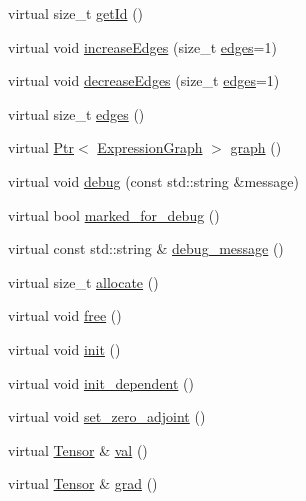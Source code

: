 \begin{DoxyCompactItemize}
\item 
virtual size\+\_\+t \hyperlink{classmarian_1_1Node_afa641168d6cd6994cd29e50f12801296}{get\+Id} ()
\item 
virtual void \hyperlink{classmarian_1_1Node_a762868fac80689771dde19f36827cebc}{increase\+Edges} (size\+\_\+t \hyperlink{classmarian_1_1Node_a872b4c21379f8fea84a023d822b0a7f5}{edges}=1)
\item 
virtual void \hyperlink{classmarian_1_1Node_a182d9b696c98f16f72fd3f9db3d1f827}{decrease\+Edges} (size\+\_\+t \hyperlink{classmarian_1_1Node_a872b4c21379f8fea84a023d822b0a7f5}{edges}=1)
\item 
virtual size\+\_\+t \hyperlink{classmarian_1_1Node_a872b4c21379f8fea84a023d822b0a7f5}{edges} ()
\item 
virtual \hyperlink{namespacemarian_ad1a373be43a00ef9ce35666145137b08}{Ptr}$<$ \hyperlink{classmarian_1_1ExpressionGraph}{Expression\+Graph} $>$ \hyperlink{classmarian_1_1Node_a6a95b0e641febd5f2893e8982f497735}{graph} ()
\item 
virtual void \hyperlink{classmarian_1_1Node_a3db75b69ad510029816420fd96ee0132}{debug} (const std\+::string \&message)
\item 
virtual bool \hyperlink{classmarian_1_1Node_ad934732664a396b3df7c64f60a88bbb0}{marked\+\_\+for\+\_\+debug} ()
\item 
virtual const std\+::string \& \hyperlink{classmarian_1_1Node_a9cc23aff9a5e62bc7f8990e2ad580f43}{debug\+\_\+message} ()
\item 
virtual size\+\_\+t \hyperlink{classmarian_1_1Node_a66c54550ad60cc510329435eb21f8589}{allocate} ()
\item 
virtual void \hyperlink{classmarian_1_1Node_ab8ceeb421fca5b912330d6b7ac2cb14b}{free} ()
\item 
virtual void \hyperlink{classmarian_1_1Node_abf3d18a7c661ba0d3d7fbcfb4e883736}{init} ()
\item 
virtual void \hyperlink{classmarian_1_1Node_a42807d121dc8bc008176a3f922b4a5eb}{init\+\_\+dependent} ()
\item 
virtual void \hyperlink{classmarian_1_1Node_ad818ff58b17c5bdcee78c19b9f0df0d6}{set\+\_\+zero\+\_\+adjoint} ()
\item 
virtual \hyperlink{namespacemarian_a88b71ec34bb354564cddc24eb80f7e14}{Tensor} \& \hyperlink{classmarian_1_1Node_a0df86f2ff4a169111d6ba0865e6fd935}{val} ()
\item 
virtual \hyperlink{namespacemarian_a88b71ec34bb354564cddc24eb80f7e14}{Tensor} \& \hyperlink{classmarian_1_1Node_a0497d2c3515385212b1086f8b8502826}{grad} ()

\end{DoxyCompactItemize}
